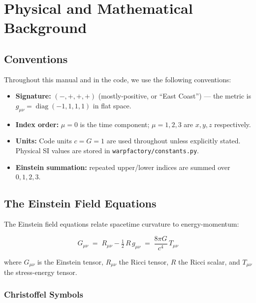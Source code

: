 \documentclass[11pt, a4paper, twoside]{report}
\newcommand{\diag}{\operatorname{diag}}
\begin{document}
\chapter{Physical and Mathematical Background}
\label{chap:physics}

\section{Conventions}

Throughout this manual and in the code, we use the following conventions:

\begin{itemize}
  \item \textbf{Signature:} $(-,+,+,+)$ (mostly-positive, or ``East
        Coast'') — the metric is $g_{\mu\nu} = \diag(-1,1,1,1)$ in flat
        space.
  \item \textbf{Index order:} $\mu = 0$ is the time component;
        $\mu=1,2,3$ are $x,y,z$ respectively.
  \item \textbf{Units:} Code units $c=G=1$ are used throughout unless
        explicitly stated.  Physical SI values are stored in
        \texttt{warpfactory/constants.py}.
  \item \textbf{Einstein summation:} repeated upper/lower indices are
        summed over $0,1,2,3$.
\end{itemize}

\section{The Einstein Field Equations}

The Einstein field equations relate spacetime curvature to energy-momentum:
\begin{mathbox}
\begin{equation}
  G_{\mu\nu} \;=\; R_{\mu\nu} - \tfrac{1}{2}\,R\,g_{\mu\nu}
             \;=\; \frac{8\pi G}{c^4}\,T_{\mu\nu}
  \label{eq:EFE}
\end{equation}
\end{mathbox}
where $G_{\mu\nu}$ is the Einstein tensor, $R_{\mu\nu}$ the Ricci tensor,
$R$ the Ricci scalar, and $T_{\mu\nu}$ the stress-energy tensor.

\subsection{Christoffel Symbols}
\end{document}

